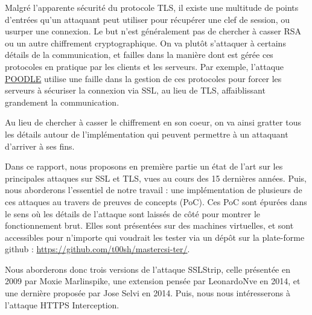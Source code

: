 Malgré l'apparente sécurité du protocole TLS, il existe une multitude de points d'entrées qu'un attaquant peut utiliser pour récupérer une clef de session, ou usurper une connexion. Le but n'est généralement pas de chercher à casser RSA ou un autre chiffrement cryptographique. On va plutôt s'attaquer à certains détails de la communication, et failles dans la manière dont est gérée ces protocoles en pratique par les clients et les serveurs. Par exemple, l'attaque \hyperref[sec:poodle]{POODLE} utilise une faille dans la gestion de ces protocoles pour forcer les serveurs à sécuriser la connexion via SSL, au lieu de TLS, affaiblissant grandement la communication.

Au lieu de chercher à casser le chiffrement en son coeur, on va ainsi gratter tous les détails autour de l'implémentation qui peuvent permettre à un attaquant d'arriver à ses fins.

Dans ce rapport, nous proposons en première partie un état de l'art sur les principales attaques sur SSL et TLS, vues au cours des 15 dernières années. Puis, nous aborderons l'essentiel de notre travail : une implémentation de plusieurs de ces attaques au travers de preuves de concepts (PoC). Ces PoC sont épurées dans le sens où les détails de l'attaque sont laissés de côté pour montrer le fonctionnement brut. Elles sont présentées sur des machines virtuelles, et sont accessibles pour n'importe qui voudrait les tester via un dépôt sur la plate-forme github : \url{https://github.com/t00sh/mastercsi-ter/}.

Nous aborderons donc trois versions de l'attaque SSLStrip, celle présentée en 2009 par Moxie Marlinspike, une extension pensée par LeonardoNve en 2014, et une dernière proposée par Jose Selvi en 2014. Puis, nous nous intéresserons à l'attaque HTTPS Interception.
